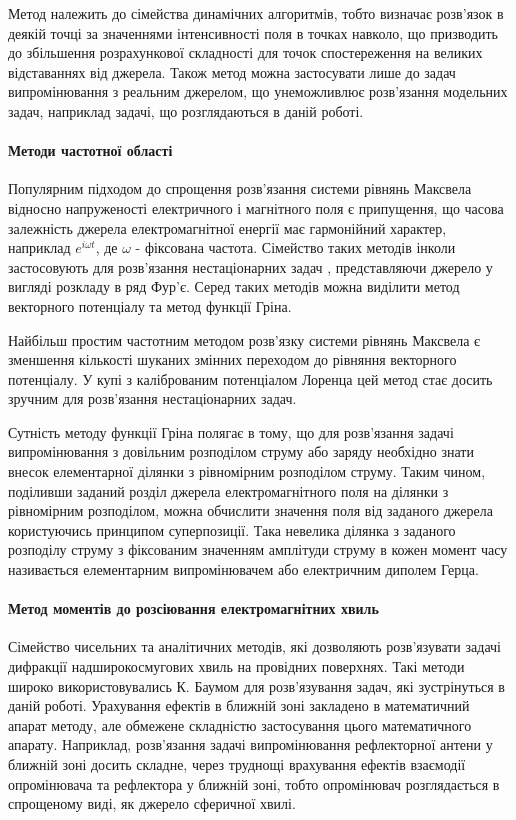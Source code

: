 Метод належить до сімейства динамічних алгоритмів, тобто визначає розв'язок 
в деякій точці за значеннями інтенсивності поля в точках навколо, що 
призводить до збільшення розрахункової складності для точок спостереження на 
великих відставаннях від джерела. Також метод можна застосувати лише до 
задач випромінювання з реальним джерелом, що унеможливлює розв'язання 
модельних задач, наприклад задачі, що розглядаються в даній роботі.

\paragraph{Методи частотної області}

Популярним підходом до спрощення розв'язання системи рівнянь Максвела відносно
напруженості електричного і магнітного поля є припущення, що часова залежність 
джерела електромагнітної енергії має гармонійний характер, наприклад 
$ e^{i \omega t} $, де $ \omega $ - фіксована частота. Сімейство таких 
методів \cite{imp:Shubarin1960} інколи застосовують для розв'язання 
нестаціонарних задач \cite{imp:Harmuth1981}, представляючи джерело у вигляді 
розкладу в ряд Фур'є. Серед таких методів можна виділити метод векторного 
потенціалу та метод функції Гріна.

Найбільш простим частотним методом розв'язку системи рівнянь Максвела є 
зменшення кількості шуканих змінних переходом до рівняння векторного 
потенціалу. У купі з каліброваним потенціалом Лоренца цей метод стає досить 
зручним для розв'язання нестаціонарних задач.

Сутність методу функції Гріна полягає в тому, що для розв'язання задачі 
випромінювання з довільним розподілом струму або заряду необхідно знати 
внесок елементарної ділянки з рівномірним розподілом струму. Таким чином, 
поділивши заданий розділ джерела електромагнітного поля на ділянки з 
рівномірним розподілом, можна обчислити значення поля від заданого джерела 
користуючись принципом суперпозиції. Така невелика ділянка з заданого розподілу 
струму з фіксованим значенням амплітуди струму в кожен момент часу називається
елементарним випромінювачем або електричним диполем Герца.

\paragraph{Метод моментів до розсіювання електромагнітних хвиль}

Сімейство чисельних та аналітичних методів, які дозволяють розв'язувати
задачі дифракції надширокосмугових хвиль на провідних поверхнях.
Такі методи широко використовувались К. Баумом для розв'язування задач, які 
зустрінуться в даній роботі. Урахування ефектів в ближній зоні закладено в
математичний апарат методу, але обмежене складністю застосування цього 
математичного апарату. Наприклад, розв'язання задачі випромінювання 
рефлекторної антени у ближній зоні досить складне, через труднощі врахування 
ефектів взаємодії опромінювача та рефлектора у ближній зоні, тобто 
опромінювач розглядається в спрощеному виді, як джерело сферичної хвилі.

